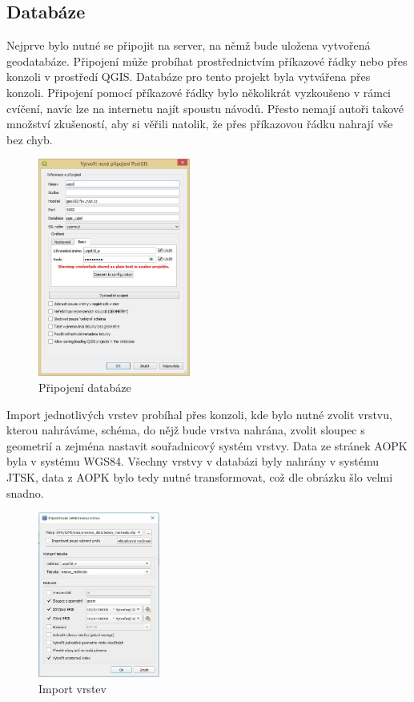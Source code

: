 \documentclass[a4paper, 12pt]{article}
\begin{document}
\subsection{Databáze}
Nejprve bylo nutné se připojit na server, na němž bude uložena vytvořená geodatabáze. Připojení může probíhat prostřednictvím příkazové řádky nebo přes konzoli v prostředí QGIS. Databáze pro tento projekt byla vytvářena přes konzoli. Připojení pomocí příkazové řádky bylo několikrát vyzkoušeno v rámci cvíčení, navíc lze na internetu najít spoustu návodů. Přesto nemají autoři takové množství zkušeností, aby si věřili natolik, že přes příkazovou řádku nahrají vše bez chyb. 

\begin{figure}[h!]
	\centering
	\includegraphics[width=5cm]{pictures/pripojeni.jpg}
	\caption{Připojení databáze}
\end{figure}

Import jednotlivých vrstev probíhal přes konzoli, kde bylo nutné zvolit vrstvu, kterou nahráváme, schéma, do nějž bude vrstva nahrána, zvolit sloupec s geometrií a zejména nastavit souřadnicový systém vrstvy. Data ze stránek AOPK byla v systému WGS84. Všechny vrstvy v databázi byly nahrány v systému JTSK, data z AOPK bylo tedy nutné transformovat, což dle obrázku šlo velmi snadno.


\begin{figure}[h!]
	\centering
	\includegraphics[width=4cm]{pictures/import.jpg}
	\caption{Import vrstev}
\end{figure}
\end{document}
